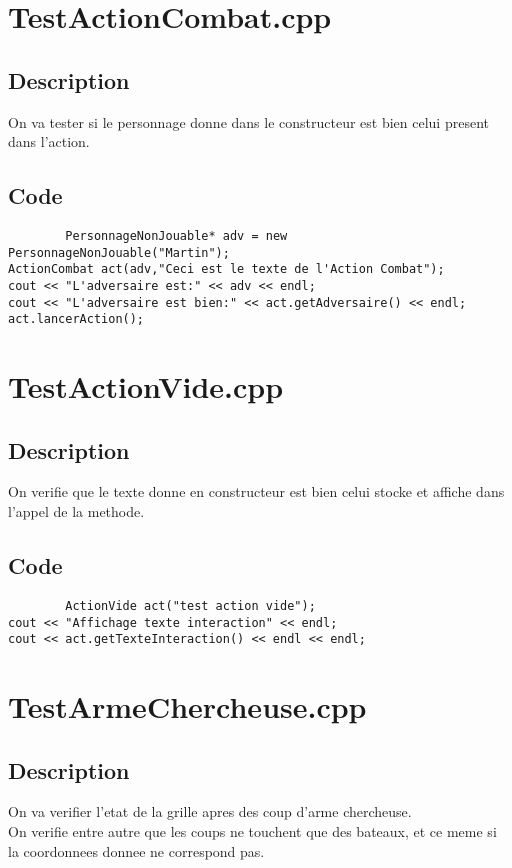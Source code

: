     \section{TestActionCombat.cpp}
        \subsection{Description}
            On va tester si le personnage donne dans le constructeur est bien celui present dans l'action.
        \subsection{Code}
	\begin{lstlisting}
		PersonnageNonJouable* adv = new PersonnageNonJouable("Martin");
ActionCombat act(adv,"Ceci est le texte de l'Action Combat");
cout << "L'adversaire est:" << adv << endl;
cout << "L'adversaire est bien:" << act.getAdversaire() << endl;
act.lancerAction();
	\end{lstlisting}
    \section{TestActionVide.cpp}
        \subsection{Description}
            On verifie que le texte donne en constructeur est bien celui stocke et affiche dans l'appel de la methode.
        \subsection{Code}
	\begin{lstlisting}
		ActionVide act("test action vide");
cout << "Affichage texte interaction" << endl;
cout << act.getTexteInteraction() << endl << endl;
	\end{lstlisting}
    \section{TestArmeChercheuse.cpp}
        \subsection{Description}
            On va verifier l'etat de la grille apres des coup d'arme chercheuse.\\
            On verifie entre autre que les coups ne touchent que des bateaux, et ce meme si la coordonnees donnee ne correspond pas.
